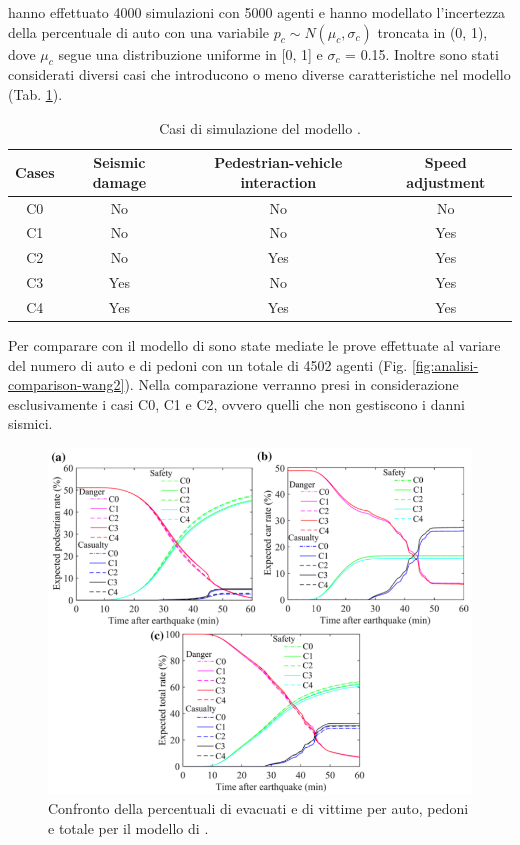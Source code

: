\textcite{wang2021novel} hanno effettuato 4000 simulazioni con 5000 agenti e
hanno modellato l'incertezza della percentuale di auto con una variabile $p_c \sim N(\mu_c, \sigma_c)$ troncata in (0, 1), 
dove $\mu_c$ segue una distribuzione uniforme in [0, 1] e $\sigma_c$ = 0.15.
Inoltre sono stati considerati diversi casi che introducono o meno diverse caratteristiche nel modello (Tab. \ref{tab:cases}).

\begin{table}[ht]
    \centering
    \begin{tabular}{|c|c|c|c|}
    \hline
    Cases & Seismic damage & Pedestrian-vehicle interaction & Speed adjustment \\ \hline
    C0 & No  & No  & No  \\ \hline
    C1 & No  & No  & Yes \\ \hline
    C2 & No  & Yes & Yes \\ \hline
    C3 & Yes & No  & Yes \\ \hline
    C4 & Yes & Yes & Yes \\ \hline
    \end{tabular}
    \caption{Casi di simulazione del modello \textcite{wang2021novel}.}
    \label{tab:cases}
\end{table}

Per comparare con il modello di \textcite{wang2021novel} sono state mediate le prove effettuate al variare del numero
di auto e di pedoni con un totale di 4502 agenti (Fig. \ref{fig:analisi-comparison-wang2}).
Nella comparazione verranno presi in considerazione esclusivamente i casi C0, C1 e C2, ovvero quelli
che non gestiscono i danni sismici.

\begin{figure}[ht]
    \centering
    \includegraphics[width=\textwidth]{images/analisi/WANG_comparison1.png}
    \caption{Confronto della percentuali di evacuati e di vittime per auto, pedoni e totale per il modello di \textcite{wang2021novel}.}
    \label{fig:analisi-comparison-wang1}
\end{figure}

